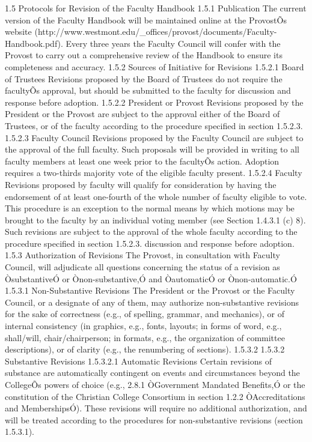 \documentclass[letterpaper, 11pt]{article}
\begin{document}
1.5 Protocols for Revision of the Faculty Handbook
1.5.1 Publication
   The current version of the Faculty Handbook will be maintained online at the ProvostÕs website (http://www.westmont.edu/_offices/provost/documents/Faculty-Handbook.pdf).  Every three years the Faculty Council will confer with the Provost to carry out a comprehensive review of the Handbook to ensure its completeness and accuracy.
1.5.2 Sources of Initiative for Revisions
1.5.2.1 Board of Trustees
Revisions proposed by the Board of Trustees do not require the facultyÕs approval, but should be submitted to the faculty for discussion and response before adoption.
1.5.2.2 President or Provost
Revisions proposed by the President or the Provost are subject to the approval either of the Board of Trustees, or of the faculty according to the procedure specified in section 1.5.2.3.
1.5.2.3 Faculty Council
Revisions proposed by the Faculty Council are subject to the approval of the full faculty. Such proposals will be provided in writing to all faculty members at least one week prior to the facultyÕs action. Adoption requires a two-thirds majority vote of the eligible faculty present.
1.5.2.4 Faculty
Revisions proposed by faculty will qualify for consideration by having the endorsement of at least one-fourth of the whole number of faculty eligible to vote. This procedure is an exception to the normal means by which motions may be brought to the faculty by an individual voting member (see Section 1.4.3.1 (c) 8).  Such revisions are subject to the approval of the whole faculty according to the procedure specified in section 1.5.2.3.
   discussion and response before adoption.
1.5.3 Authorization of Revisions
       The Provost, in consultation with Faculty Council, will adjudicate all questions concerning the status of a revision as ÒsubstantiveÓ or Ònon-substantive,Ó and ÒautomaticÓ or Ònon-automatic.Ó
1.5.3.1 Non-Substantive Revisions
The President or the Provost or the Faculty Council, or a designate of any of them, may authorize non-substantive revisions for the sake of correctness (e.g., of spelling, grammar, and mechanics), or of internal consistency (in graphics, e.g., fonts, layouts; in forms of word, e.g., shall/will, chair/chairperson; in formats, e.g., the organization of committee descriptions), or of clarity (e.g., the renumbering of sections).
1.5.3.2 1.5.3.2 Substantive Revisions
1.5.3.2.1 Automatic Revisions
Certain revisions of substance are automatically contingent on events and circumstances beyond the CollegeÕs powers of choice (e.g., 2.8.1 ÒGovernment Mandated Benefits,Ó or the constitution of the Christian College Consortium in section 1.2.2 ÒAccreditations and MembershipsÓ). These revisions will require no additional authorization, and will be treated according to the procedures for non-substantive revisions (section 1.5.3.1).
\end{document}
